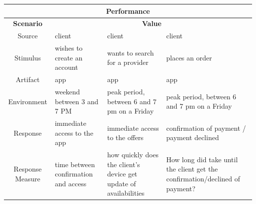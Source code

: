 \begin{table}[H]
    \begin{tabularx}{\textwidth}{|c|X|X|X|}
        \hline
        \multicolumn{4}{c}{\textbf{Performance}} \\
        \hline
        \toprule
        \multicolumn{1}{|c|}{\textbf{Scenario}} & \multicolumn{3}{|c|}{\textbf{Value}} \\
        \midrule
        Source & \Gls{client} & \Gls{client} & \Gls{client}  \\
        \hline
        Stimulus & wishes to create an account & wants to search for a \gls{provider} & places an order \\
        \hline
        Artifact & app & app & app \\
        \hline
        Environment & weekend between 3 and 7 PM & peak period, between 6 and 7 pm on a Friday & peak period, between 6 and 7 pm on a Friday \\
        \hline
        Response & immediate access to the app  & immediate access to the offers  & confirmation of payment / payment declined \\
        \hline
        Response Measure & time between confirmation and access & how quickly does the client's device get update of availabilities 
        & How long did take until the client get the confirmation/declined of payment? \\
        \bottomrule
    \end{tabularx}
\end{table}


